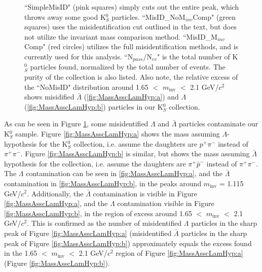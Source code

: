 \documentclass[../AnalysisNoteJBuxton.tex]{subfiles}
\begin{document}
\begin{figure}[h!]
{  ``SimpleMisID" (pink squares) simply cuts out the entire peak, which throws away some good K$^{0}_{S}$ particles.
  ``MisID\_NoM$_{inv}$Comp" (green squares) uses the misidentification cut outlined in the text, but does not utilize the invariant mass comparison method.
  ``MisID\_M$_{inv}$Comp" (red circles) utilizes the full misidentification methods, and is currently used for this analysis.
  ``N$_{pass}$/N$_{ev}$" is the total number of K$^{0}_{S}$ particles found, normalized by the total number of events.  The purity of the collection is also listed. 
  Also note, the relative excess of the ``NoMisID" distribution around 1.65 $<$ $m_{\mathrm{inv}}$ $<$ 2.1 GeV/$c^{2}$ shows misidified $\bar{\Lambda}$ (\ref{fig:MassAsscLamHyp:a}) and $\Lambda$ (\ref{fig:MassAsscLamHyp:b}) particles in our K$^{0}_{S}$ collection.}
  \label{fig:MassAsscLamHyp}
\end{figure}



As can be seen in Figure \ref{fig:MassAsscLamHyp}, some misidentified $\Lambda$ and $\bar{\Lambda}$ particles contaminate our K$^{0}_{S}$ sample.
Figure \ref{fig:MassAsscLamHyp:a} shows the mass assuming $\Lambda$-hypothesis for the K$^{0}_{S}$ collection, i.e. assume the daughters are $p^{+}\pi^{-}$ instead of $\pi^{+}\pi^{-}$.
Figure \ref{fig:MassAsscLamHyp:b} is similar, but shows the mass assuming $\bar{\Lambda}$ hypothesis for the collection, i.e. assume the daughters are $\pi^{+}\bar{p}^{-}$ instead of $\pi^{+}\pi^{-}$.
The $\Lambda$ contamination can be seen in \ref{fig:MassAsscLamHyp:a}, and the $\bar{\Lambda}$ contamination in \ref{fig:MassAsscLamHyp:b}, in the peaks around $m_{\mathrm{inv}}$ = 1.115 GeV/$c^{2}$.
Additionally, the $\bar{\Lambda}$ contamination is visible in Figure \ref{fig:MassAsscLamHyp:a}, and the $\Lambda$ contamination visible in Figure \ref{fig:MassAsscLamHyp:b}, in the region of excess around 1.65 $<$ $m_{\mathrm{inv}}$ $<$ 2.1 GeV/$c^{2}$.
This is confirmed as the number of misidentified $\Lambda$ particles in the sharp peak of Figure \ref{fig:MassAsscLamHyp:a} (misidentified $\bar{\Lambda}$ particles in the sharp peak of Figure \ref{fig:MassAsscLamHyp:b}) approximately equals the excess found in the 1.65 $<$ $m_{\mathrm{inv}}$ $<$ 2.1 GeV/$c^{2}$ region of Figure \ref{fig:MassAsscLamHyp:a} (Figure \ref{fig:MassAsscLamHyp:b}).
\end{document}
